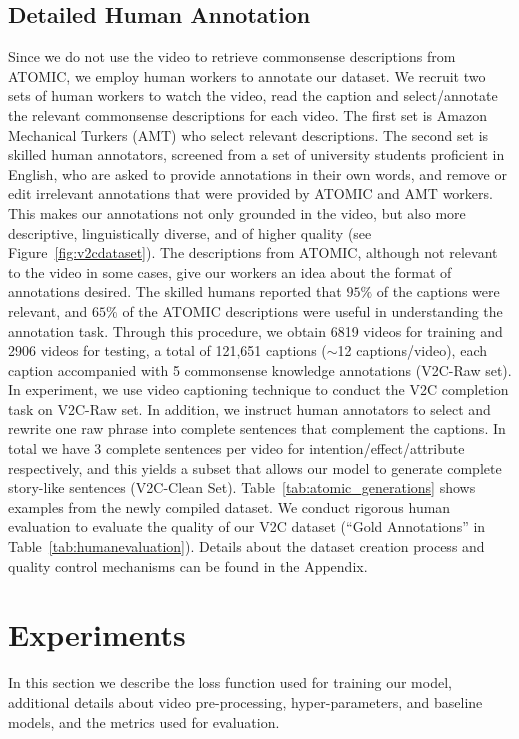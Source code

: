     \subsection{Detailed Human Annotation}
    Since we do not use the video to retrieve commonsense descriptions from ATOMIC, we employ human workers to annotate our dataset.
    We recruit two sets of human workers to watch the video, read the caption and select/annotate the relevant commonsense descriptions for each video.
    The first set is Amazon Mechanical Turkers (AMT) who select relevant descriptions.
    The second set is skilled human annotators, screened from a set of university students proficient in English, who are asked to provide annotations in their own words, and remove or edit irrelevant annotations that were provided by ATOMIC and AMT workers.
    This makes our annotations not only grounded in the video, but also more descriptive, linguistically diverse, and of higher quality (see Figure~\ref{fig:v2cdataset}).
    The descriptions from ATOMIC, although not relevant to the video in some cases, give our workers an idea about the format of annotations desired.
    The skilled humans reported that $95\%$ of the captions were relevant, and $65\%$ of the ATOMIC descriptions were useful in understanding the annotation task. Through this procedure, we obtain 6819 videos for training and 2906 videos for testing, a total of 121,651 captions ($\sim$12 captions/video), each caption accompanied with 5 commonsense knowledge annotations (V2C-Raw set). In experiment, we use video captioning technique to conduct the V2C completion task on V2C-Raw set.
    In addition, we instruct human annotators to select and rewrite one raw phrase into complete sentences that complement the captions.
    In total we have 3 complete sentences per video for intention/effect/attribute respectively, and this yields a subset that allows our model to generate complete story-like sentences (V2C-Clean Set).
    Table~\ref{tab:atomic_generations} shows examples from the newly compiled dataset. 
    We conduct rigorous human evaluation to evaluate the quality of our V2C dataset (``Gold Annotations'' in Table~\ref{tab:humanevaluation}).
    Details about the dataset creation process and quality control mechanisms can be found in the Appendix.

 
\section{Experiments}
In this section we describe the loss function used for training our model, additional details about video pre-processing, hyper-parameters, and baseline models, and the metrics used for evaluation.

